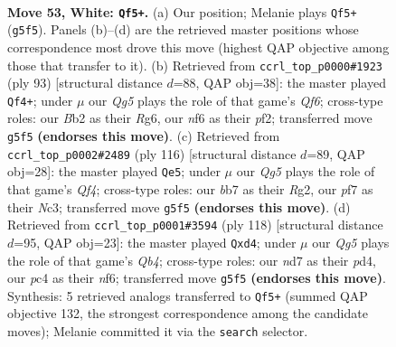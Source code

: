 \documentclass[11pt]{article}
\begin{document}
\clearpage

\begin{figure}[p]\centering
\begin{subfigure}{0.46\textwidth}\centering
\resizebox{\linewidth}{!}{%
\newchessgame
\chessboard[
  setfen={3q4/1b1n1p1k/3P1n2/6Q1/p1p4P/5pP1/PB5K/3R4 w - - 6 53},
  showmover=false,
  pgfstyle=straightmove, color=movearrow, markmove={g5-f5}
]}
\caption{}
\end{subfigure}\hfill
\begin{subfigure}{0.46\textwidth}\centering
\resizebox{\linewidth}{!}{%
\newchessgame
\chessboard[
  setfen={7k/6p1/6r1/p1Q4p/P3p2P/4Nq2/5P1K/5R2 b - - 6 47},
  showmover=false,
  pgfstyle=straightmove, color=movearrow, markmove={f3-f4}
]}
\caption{}
\end{subfigure}
\\[4pt]
\begin{subfigure}{0.46\textwidth}\centering
\resizebox{\linewidth}{!}{%
\newchessgame
\chessboard[
  setfen={5q1k/7n/1pp1bn1P/p7/P1P2Q1p/1PN5/6RK/8 w - - 2 59},
  showmover=false,
  pgfstyle=straightmove, color=movearrow, markmove={f4-e5}
]}
\caption{}
\end{subfigure}\hfill
\begin{subfigure}{0.46\textwidth}\centering
\resizebox{\linewidth}{!}{%
\newchessgame
\chessboard[
  setfen={8/4qk1p/1P3n2/3p1p2/1Q1p1P2/5BPK/8/8 w - - 7 60},
  showmover=false,
  pgfstyle=straightmove, color=movearrow, markmove={b4-d4}
]}
\caption{}
\end{subfigure}
\caption{\textbf{Move 53, White: \texttt{Qf5+}.} (a) Our position; Melanie plays \texttt{Qf5+} (\texttt{g5f5}). Panels (b)--(d) are the retrieved master positions whose correspondence most drove this move (highest QAP objective among those that transfer to it). (b) Retrieved from \texttt{ccrl\_top\_p0000\#1923} (ply 93) [structural distance $d$=88, QAP obj=38]: the master played \texttt{Qf4+}; under $\mu$ our \emph{Qg5} plays the role of that game's \emph{Qf6}; cross-type roles: our \emph{B}b2 as their \emph{R}g6, our \emph{n}f6 as their \emph{p}f2; transferred move \texttt{g5f5} \textbf{(endorses this move)}. (c) Retrieved from \texttt{ccrl\_top\_p0002\#2489} (ply 116) [structural distance $d$=89, QAP obj=28]: the master played \texttt{Qe5}; under $\mu$ our \emph{Qg5} plays the role of that game's \emph{Qf4}; cross-type roles: our \emph{b}b7 as their \emph{R}g2, our \emph{p}f7 as their \emph{N}c3; transferred move \texttt{g5f5} \textbf{(endorses this move)}. (d) Retrieved from \texttt{ccrl\_top\_p0001\#3594} (ply 118) [structural distance $d$=95, QAP obj=23]: the master played \texttt{Qxd4}; under $\mu$ our \emph{Qg5} plays the role of that game's \emph{Qb4}; cross-type roles: our \emph{n}d7 as their \emph{p}d4, our \emph{p}c4 as their \emph{n}f6; transferred move \texttt{g5f5} \textbf{(endorses this move)}. Synthesis: 5 retrieved analogs transferred to \texttt{Qf5+} (summed QAP objective 132, the strongest correspondence among the candidate moves); Melanie committed it via the \texttt{search} selector.}
\label{fig:thought-m104}
\end{figure}
\end{document}

